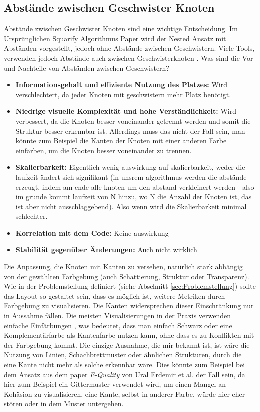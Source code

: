 \subsection{Abstände zwischen Geschwister Knoten} \label{sec:AbständeGeschwister}
Abstände zwischen Geschwister Knoten sind eine wichtige Entscheidung. Im Ursprünglichen Squarify Algorithmus Paper \cite{bruls2000squarified} wird der Nested Ansatz mit Abständen vorgestellt, jedoch ohne Abstände zwischen Geschwistern. Viele Tools, verwenden jedoch Abstände auch zwischen Geschwisterknoten \cite{codeCity1, code_charta_webdemo, sereene_website}.
Was sind die Vor- und Nachteile von Abständen zwischen Geschwistern?
\begin{itemize}
    \item \textbf{Informationsgehalt und effiziente Nutzung des Platzes:} Wird verschlechtert, da jeder Knoten mit geschwistern mehr Platz benötigt. 
    \item \textbf{Niedrige visuelle Komplexität und hohe Verständlichkeit:} Wird verbessert, da die Knoten besser voneinander getrennt werden und somit die Struktur besser erkennbar ist. Allerdings muss das nicht der Fall sein, man könnte zum Beispiel die Kanten der Knoten mit einer anderen Farbe einfärben, um die Knoten besser voneinander zu trennen.
    \item \textbf{Skalierbarkeit:} Eigentlich wenig auswirkung auf skalierbarkeit, weder die laufzeit ändert sich signifikant (in unsrem algorithmus werden die abstände erzeugt, indem am ende alle knoten um den abstand verkleinert werden - also im grunde kommt laufzeit von N hinzu, wo N die Anzahl der Knoten ist, das ist aber nicht ausschlaggebend). Also wenn wird die Skalierbarkeit minimal schlechter.
    \item \textbf{Korrelation mit dem Code:} Keine auswirkung
    \item \textbf{Stabilität gegenüber Änderungen:} Auch nicht wirklich
\end{itemize}

Die Anpassung, die Knoten mit Kanten zu versehen, natürlich stark abhängig von der gewählten Farbgebung (auch Schattierung, Struktur oder Transparenz). Wie in der Problemstellung definiert (siehe Abschnitt \ref{sec:Problemstellung}) sollte das Layout so gestaltet sein, dass es möglich ist, weitere Metriken durch Farbgebung zu visualisieren. Die Kanten widersprechen dieser Einschränkung nur in Aussahme fällen. Die meisten Visualisierungen in der Praxis verwenden einfache Einfärbungen \cite{codeCity1, code_charta_webdemo, sereene_website}, was bedeutet, dass man einfach Schwarz oder eine Komplementärfarbe als Kantenfarbe nutzen kann, ohne dass es zu Konflikten mit der Farbgebung kommt. Die einzige Ausnahme, die mir bekannt ist, ist wäre die Nutzung von Linien, Schachbrettmuster oder ähnlichen Strukturen, durch die eine Kante nicht mehr als solche erkennbar wäre. Dies könnte zum Beispiel bei dem Ansatz aus dem paper \textit{E-Quality} von Ural Erdemir et al. \cite{eQuality} der Fall sein, da hier zum Beispiel ein Gittermuster verwendet wird, um einen Mangel an Kohäsion zu visualisieren, eine Kante, selbst in anderer Farbe, würde hier eher stören oder in dem Muster untergehen. 

